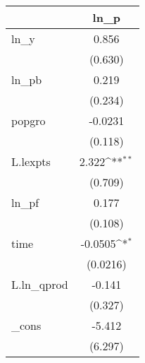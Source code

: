 {
\def\sym#1{\ifmmode^{#1}\else\(^{#1}\)\fi}
\begin{tabular}{l*{1}{c}}
\hline\hline
            &\multicolumn{1}{c}{ln\_p}\\
\hline
ln\_y        &       0.856         \\
            &     (0.630)         \\
[1em]
ln\_pb       &       0.219         \\
            &     (0.234)         \\
[1em]
popgro      &     -0.0231         \\
            &     (0.118)         \\
[1em]
L.lexpts    &       2.322\sym{**} \\
            &     (0.709)         \\
[1em]
ln\_pf       &       0.177         \\
            &     (0.108)         \\
[1em]
time        &     -0.0505\sym{*}  \\
            &    (0.0216)         \\
[1em]
L.ln\_qprod  &      -0.141         \\
            &     (0.327)         \\
[1em]
\_cons      &      -5.412         \\
            &     (6.297)         \\
\hline\hline
\end{tabular}
}
